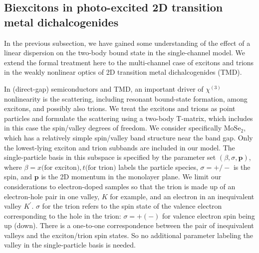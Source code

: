 \documentclass[aps,prb,superscriptaddress,letterpaper,amsmath,amssymb,twocolumn,preprintnumbers]{revtex4}
\begin{document}
\subsection{Biexcitons in photo-excited 2D transition metal dichalcogenides}
\label{xt-T-matrix.sec}




In the previous subsection, we have gained some understanding of the effect of a linear dispersion on the two-body bound state in the single-channel model. We extend the formal treatment here to the multi-channel case of excitons and trions in the weakly nonlinear optics of 2D transition metal dichalcogenides (TMD).

In (direct-gap) semiconductors and TMD, an important driver of $\chi^{(3)}$ nonlinearity is the scattering, including resonant bound-state formation, among excitons, and possibly also trions. We treat the excitons and trions as point particles and formulate the scattering using a two-body T-matrix, which includes in this case the spin/valley degrees of freedom. We consider specifically $\text{MoSe}_2$, which has a relatively simple spin/valley band structure near the band gap. Only the lowest-lying exciton and trion subbands are included in our model. The single-particle basis in this subspace is specified by the parameter set $(\beta, \sigma, \mathbf{p})$, where $\beta = x \textrm{(for exciton)} , t \textrm{(for trion)}$ labels the particle species, $\sigma = + / -$ is the spin, and $\mathbf{p}$ is the 2D momentum in the monolayer plane. We limit our considerations to electron-doped samples so that the trion is made up of an electron-hole pair in one valley, $K$ for example, and an electron in an inequivalent valley $K^{\prime}$. $\sigma$ for the trion refers to the spin state of the valence electron corresponding to the hole in the trion: $\sigma = + (-)$ for valence electron spin being up (down). There is a one-to-one correspondence between the pair of inequivalent valleys and the exciton/trion spin states. So no additional parameter labeling the valley in the single-particle basis is needed.
\end{document}
